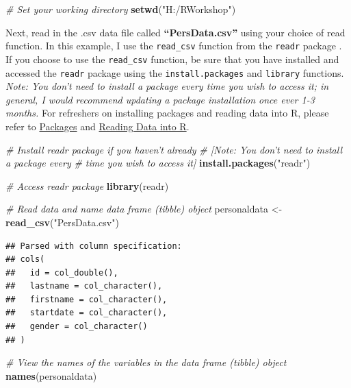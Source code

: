 \documentclass[]{book}
\newenvironment{Shaded}{\begin{snugshade}}{\end{snugshade}}
\newcommand{\KeywordTok}[1]{\textcolor[rgb]{0.13,0.29,0.53}{\textbf{#1}}}
\newcommand{\StringTok}[1]{\textcolor[rgb]{0.31,0.60,0.02}{#1}}
\newcommand{\CommentTok}[1]{\textcolor[rgb]{0.56,0.35,0.01}{\textit{#1}}}
\newcommand{\NormalTok}[1]{#1}
\begin{document}
\begin{Shaded}
\begin{Highlighting}[]
\CommentTok{# Set your working directory}
\KeywordTok{setwd}\NormalTok{(}\StringTok{"H:/RWorkshop"}\NormalTok{)}
\end{Highlighting}
\end{Shaded}

Next, read in the .csv data file called \textbf{``PersData.csv''} using
your choice of read function. In this example, I use the
\texttt{read\_csv} function from the \texttt{readr} package
\citep{R-readr}. If you choose to use the \texttt{read\_csv} function,
be sure that you have installed and accessed the \texttt{readr} package
using the \texttt{install.packages} and \texttt{library} functions.
\emph{Note: You don't need to install a package every time you wish to
access it; in general, I would recommend updating a package installation
once ever 1-3 months.} For refreshers on installing packages and reading
data into R, please refer to \protect\hyperlink{packages}{Packages} and
\protect\hyperlink{read}{Reading Data into R}.

\begin{Shaded}
\begin{Highlighting}[]
\CommentTok{# Install readr package if you haven't already}
\CommentTok{# [Note: You don't need to install a package every }
\CommentTok{# time you wish to access it]}
\KeywordTok{install.packages}\NormalTok{(}\StringTok{"readr"}\NormalTok{)}
\end{Highlighting}
\end{Shaded}

\begin{Shaded}
\begin{Highlighting}[]
\CommentTok{# Access readr package}
\KeywordTok{library}\NormalTok{(readr)}

\CommentTok{# Read data and name data frame (tibble) object}
\NormalTok{personaldata <-}\StringTok{ }\KeywordTok{read_csv}\NormalTok{(}\StringTok{"PersData.csv"}\NormalTok{)}
\end{Highlighting}
\end{Shaded}

\begin{verbatim}
## Parsed with column specification:
## cols(
##   id = col_double(),
##   lastname = col_character(),
##   firstname = col_character(),
##   startdate = col_character(),
##   gender = col_character()
## )
\end{verbatim}

\begin{Shaded}
\begin{Highlighting}[]
\CommentTok{# View the names of the variables in the data frame (tibble) object}
\KeywordTok{names}\NormalTok{(personaldata)}
\end{Highlighting}
\end{Shaded}
\end{document}
